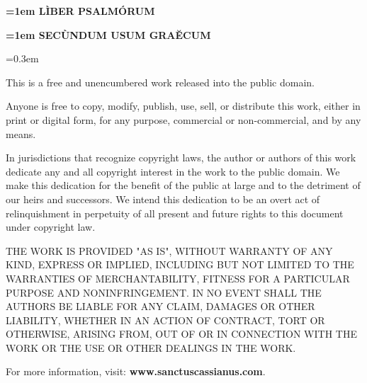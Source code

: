 \documentclass[twoside,11pt]{article}
\begin{document}
\pagestyle{empty}
{
  \begin{center}

  \vspace*{15em}

  {\bfseries\Huge{}\font=1em \uppercase{lìber psalmórum}}

  \vspace*{5em}

  {\bfseries\Large{}\font=1em \uppercase{secùndum usum graĕcum}}

  \vfill

  \end{center}
}

\newpage

{

\vspace*{5em}\font=0.3em

\noindent This is a free and unencumbered work released into the public domain.

\medskip

\noindent Anyone is free to copy, modify, publish, use, sell, or distribute this work, either in print or digital form, for any purpose, commercial or non-commercial, and by any means.

\medskip

\noindent In jurisdictions that recognize copyright laws, the author or authors of this work dedicate any and all copyright interest in the work to the public domain. We make this dedication for the benefit of the public at large and to the detriment of our heirs and successors. We intend this dedication to be an overt act of relinquishment in perpetuity of all present and future rights to this document under copyright law.

\medskip

\noindent THE WORK IS PROVIDED "AS IS", WITHOUT WARRANTY OF ANY KIND, EXPRESS OR IMPLIED, INCLUDING BUT NOT LIMITED TO THE WARRANTIES OF MERCHANTABILITY, FITNESS FOR A PARTICULAR PURPOSE AND NONINFRINGEMENT. IN NO EVENT SHALL THE AUTHORS BE LIABLE FOR ANY CLAIM, DAMAGES OR OTHER LIABILITY, WHETHER IN AN ACTION OF CONTRACT, TORT OR OTHERWISE, ARISING FROM, OUT OF OR IN CONNECTION WITH THE WORK OR THE USE OR OTHER DEALINGS IN THE WORK.

\bigskip

\noindent For more information, visit: \hspace{\parindent} {\bfseries www.sanctuscassianus.com}.

\vfill

}
\end{document}
